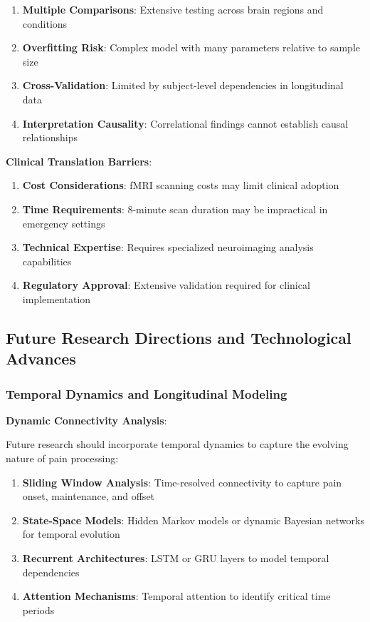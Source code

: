 \begin{enumerate}
\item \textbf{Multiple Comparisons}: Extensive testing across brain regions and conditions
\item \textbf{Overfitting Risk}: Complex model with many parameters relative to sample size
\item \textbf{Cross-Validation}: Limited by subject-level dependencies in longitudinal data
\item \textbf{Interpretation Causality}: Correlational findings cannot establish causal relationships
\end{enumerate}

\textbf{Clinical Translation Barriers}:

\begin{enumerate}
\item \textbf{Cost Considerations}: fMRI scanning costs may limit clinical adoption
\item \textbf{Time Requirements}: 8-minute scan duration may be impractical in emergency settings
\item \textbf{Technical Expertise}: Requires specialized neuroimaging analysis capabilities
\item \textbf{Regulatory Approval}: Extensive validation required for clinical implementation
\end{enumerate}

\subsection{Future Research Directions and Technological Advances}

\subsubsection{Temporal Dynamics and Longitudinal Modeling}

\textbf{Dynamic Connectivity Analysis}:

Future research should incorporate temporal dynamics to capture the evolving nature of pain processing:

\begin{enumerate}
\item \textbf{Sliding Window Analysis}: Time-resolved connectivity to capture pain onset, maintenance, and offset
\item \textbf{State-Space Models}: Hidden Markov models or dynamic Bayesian networks for temporal evolution
\item \textbf{Recurrent Architectures}: LSTM or GRU layers to model temporal dependencies
\item \textbf{Attention Mechanisms}: Temporal attention to identify critical time periods
\end{enumerate}

